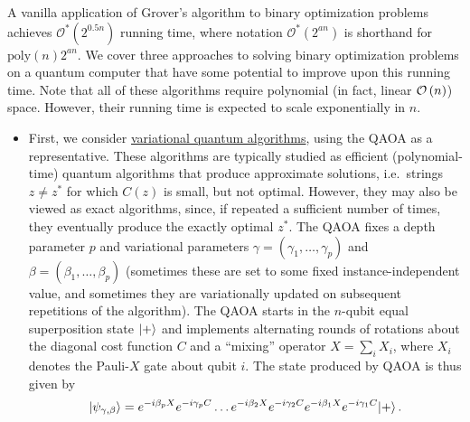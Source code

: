 \begin{refsection}
A vanilla application of Grover's algorithm to binary optimization problems achieves $\mathcal{O}^*(2^{0.5n})$ running time, where notation $\mathcal{O}^*(2^{an})$ is shorthand for $\mathrm{poly}(n)2^{an}$. We cover three approaches to solving binary optimization problems on a quantum computer that have some potential to improve upon this running time. Note that all of these algorithms require polynomial (in fact, linear $\mathcal{O}\left( n \right)$) space. However, their running time is expected to scale exponentially in $n$. 
\begin{itemize}
\item 
First, we consider \hyperref[prim:VQA]{variational quantum algorithms}, using the QAOA \cite{farhi2014QAOA} as a representative. These algorithms are typically studied as efficient (polynomial-time) quantum algorithms that produce approximate solutions, i.e.~strings $z \neq z^*$ for which $C(z)$ is small, but not optimal. However, they may also be viewed as exact algorithms, since, if repeated a sufficient number of times, they eventually produce the exactly optimal $z^*$. The QAOA fixes a depth parameter $p$ and variational parameters $\gamma = (\gamma_1,\ldots,\gamma_p)$ and $\beta = (\beta_1,\ldots,\beta_p)$ (sometimes these are set to some fixed instance-independent value, and sometimes they are variationally updated on subsequent repetitions of the algorithm). The QAOA starts in the $n$-qubit equal superposition state $\lvert+\rangle$ and implements alternating rounds of rotations about the diagonal cost function $C$ and a ``mixing'' operator $X = \sum_i X_i$, where $X_i$ denotes the Pauli-$X$ gate about qubit $i$. The state produced by QAOA is thus given by
\begin{equation}
    \lvert\psi_{\gamma,\beta}\rangle = e^{-i\beta_p X}e^{-i\gamma_p C}\ldots e^{-i\beta_2 X}e^{-i\gamma_2 C}e^{-i\beta_1X}e^{-i\gamma_1 C}\lvert+\rangle\,.
\end{equation}

\end{itemize}
\end{refsection}
